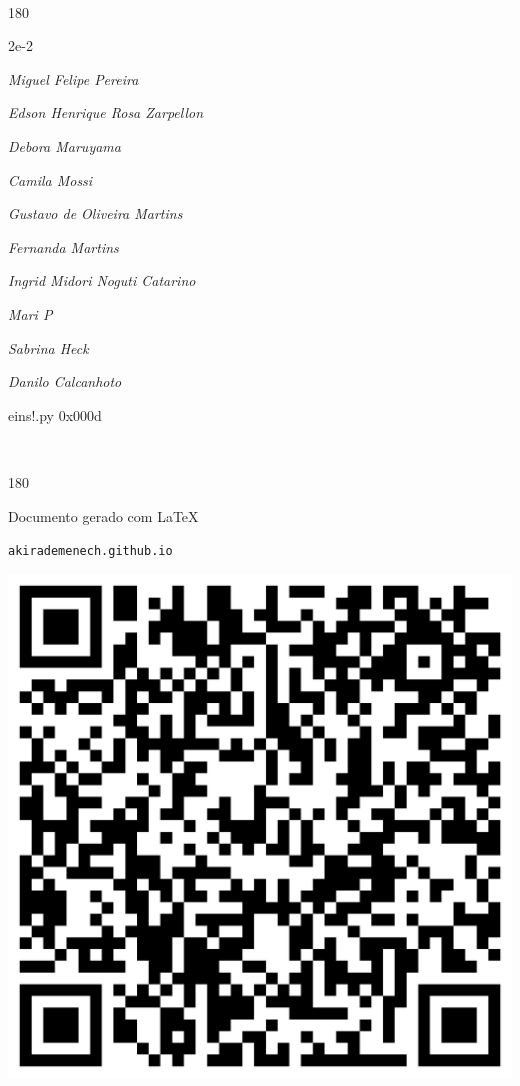 \documentclass[12pt]{article}
\begin{document}
	\ 
	\vfill
	\begin{turn}{180}	
		\begin{minipage}{\textwidth}
		  	\ttfamily %
			\centering
			{\Huge 2e-2}
		  
			\hfill
		  
			

\textit{\small Miguel Felipe Pereira}

\textit{\small Edson Henrique Rosa Zarpellon}

\textit{\small Debora Maruyama}

\textit{\small Camila Mossi}

\textit{\small Gustavo de Oliveira Martins}

\textit{\small Fernanda Martins}

\textit{\small Ingrid Midori Noguti Catarino}

\textit{\small Mari P}

\textit{\small Sabrina Heck}

\textit{\small Danilo Calcanhoto}

\bigskip

eins!.py
0x000d


		\end{minipage}	
	\end{turn}
	\vfill
	\

\pagebreak

	\begin{turn}{180}	
		\begin{minipage}{\textwidth}		  
		  Documento gerado com \LaTeX			
		  
		  \texttt{akirademenech.github.io}

		  \includegraphics[height=0.3\textheight]{2e-2.pdf}

		\end{minipage}	
	\end{turn}  
		  
\end{document}
